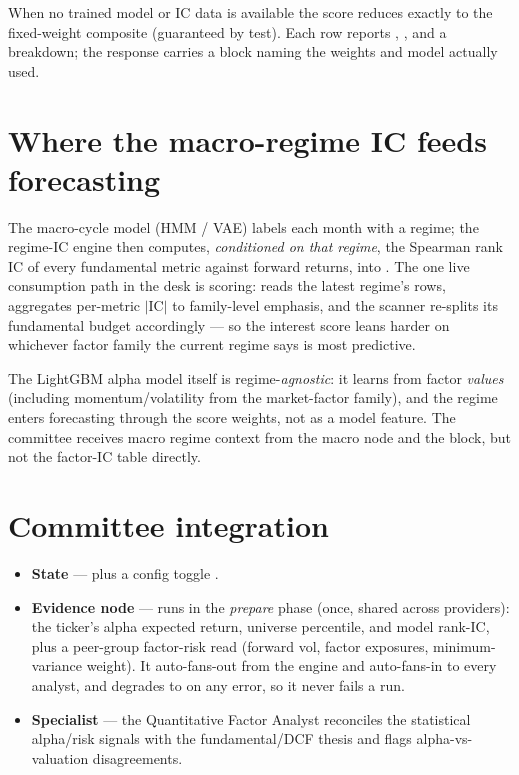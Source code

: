 \documentclass[11pt]{article}
\begin{document}
When no trained model or IC data is available the score reduces exactly to the
fixed-weight composite (guaranteed by test). Each row reports ,
, and a  breakdown; the response
carries a  block naming the weights and model actually used.

\section{Where the macro-regime IC feeds forecasting}
\label{sec:regime}
The macro-cycle model (HMM / VAE) labels each month with a regime; the regime-IC
engine then computes, \emph{conditioned on that regime}, the Spearman rank IC of
every fundamental metric against forward returns, into
. The one live consumption path in the desk
is scoring:  reads the latest regime's rows,
aggregates per-metric $|\text{IC}|$ to family-level emphasis, and the scanner
re-splits its fundamental budget accordingly --- so the interest score leans harder
on whichever factor family the current regime says is most predictive.

\begin{notebox}[Scope]
The LightGBM alpha model itself is regime-\emph{agnostic}: it learns from factor
\emph{values} (including momentum/volatility from the market-factor family), and
the regime enters forecasting through the score weights, not as a model feature.
The committee receives macro regime context from the macro node and the
 block, but not the factor-IC table directly.
\end{notebox}

\section{Committee integration}
\begin{itemize}
  \item \textbf{State} ---  plus a
        config toggle .
  \item \textbf{Evidence node} ---  runs in the
        \emph{prepare} phase (once, shared across providers): the ticker's alpha
        expected return, universe percentile, and model rank-IC, plus a peer-group
        factor-risk read (forward vol, factor exposures, minimum-variance weight).
        It auto-fans-out from the engine and auto-fans-in to every analyst, and
        degrades to  on any error, so it never fails a run.
  \item \textbf{Specialist} --- the Quantitative Factor Analyst reconciles the
        statistical alpha/risk signals with the fundamental/DCF thesis and flags
        alpha-vs-valuation disagreements.
\end{itemize}
\end{document}
